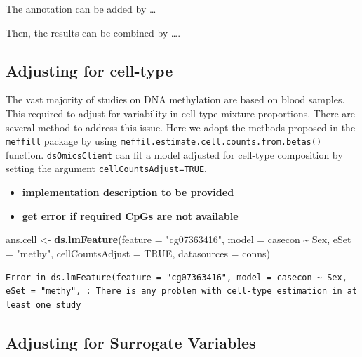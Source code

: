 \documentclass[]{article}
\newenvironment{Shaded}{\begin{snugshade}}{\end{snugshade}}
\newcommand{\DataTypeTok}[1]{\textcolor[rgb]{0.13,0.29,0.53}{#1}}
\newcommand{\KeywordTok}[1]{\textcolor[rgb]{0.13,0.29,0.53}{\textbf{#1}}}
\newcommand{\NormalTok}[1]{#1}
\newcommand{\OperatorTok}[1]{\textcolor[rgb]{0.81,0.36,0.00}{\textbf{#1}}}
\newcommand{\OtherTok}[1]{\textcolor[rgb]{0.56,0.35,0.01}{#1}}
\newcommand{\StringTok}[1]{\textcolor[rgb]{0.31,0.60,0.02}{#1}}
\providecommand{\tightlist}{%
  \setlength{\itemsep}{0pt}\setlength{\parskip}{0pt}}
\begin{document}
The annotation can be added by \ldots{}

Then, the results can be combined by \ldots.

\hypertarget{adjusting-for-cell-type}{%
\subsection{Adjusting for cell-type}\label{adjusting-for-cell-type}}

The vast majority of studies on DNA methylation are based on blood
samples. This required to adjust for variability in cell-type mixture
proportions. There are several method to address this issue. Here we
adopt the methods proposed in the \texttt{meffill} package by using
\texttt{meffil.estimate.cell.counts.from.betas()} function.
\texttt{dsOmicsClient} can fit a model adjusted for cell-type
composition by setting the argument \texttt{cellCountsAdjust=TRUE}.

\begin{itemize}
\tightlist
\item
  \textbf{implementation description to be provided}
\item
  \textbf{get error if required CpGs are not available}
\end{itemize}

\begin{Shaded}
\begin{Highlighting}[]
\NormalTok{ans.cell <{-}}\StringTok{ }\KeywordTok{ds.lmFeature}\NormalTok{(}\DataTypeTok{feature =} \StringTok{"cg07363416"}\NormalTok{, }
                    \DataTypeTok{model =}\NormalTok{ casecon }\OperatorTok{\textasciitilde{}}\StringTok{ }\NormalTok{Sex, }
                    \DataTypeTok{eSet =} \StringTok{"methy"}\NormalTok{, }
                    \DataTypeTok{cellCountsAdjust =} \OtherTok{TRUE}\NormalTok{,}
                    \DataTypeTok{datasources =}\NormalTok{ conns)}
\end{Highlighting}
\end{Shaded}

\begin{verbatim}
Error in ds.lmFeature(feature = "cg07363416", model = casecon ~ Sex, eSet = "methy", : There is any problem with cell-type estimation in at least one study
\end{verbatim}

\hypertarget{adjusting-for-surrogate-variables}{%
\subsection{Adjusting for Surrogate
Variables}\label{adjusting-for-surrogate-variables}}
\end{document}
